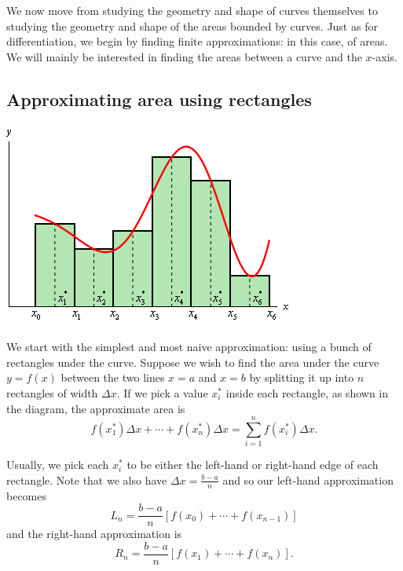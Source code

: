 


We now move from studying the geometry and shape of curves themselves to studying the geometry and shape of the areas bounded by curves. Just as
for differentiation, we begin by finding finite approximations: in this case, of areas. We will mainly be interested in finding the areas between
a curve and the $ x$-axis.

\subsection*{Approximating area using rectangles}
\begin{center}
  \includegraphics[width=0.4\linewidth]{approx-rectangles}
\end{center}
We start with the simplest and most naive approximation: using a bunch of rectangles under the curve. Suppose
we wish to find the area under the curve $ y = f(x) $ between the two lines $ x = a $ and $ x = b $ by splitting
it up into $ n $ rectangles of width $ \Delta x $. If we pick a value $ x_i^\ast $ inside each rectangle, as shown
in the diagram, the approximate area is
\begin{displaymath}
  f(x_1^\ast) \Delta x + \cdots + f(x_n^\ast) \Delta x = \sum_{i = 1}^n f(x_i^\ast) \Delta x.
\end{displaymath}

Usually, we pick each $ x_i^\ast $ to be either the left-hand or right-hand edge of each rectangle. Note that
we also have $ \Delta x = \frac{b - a}{n} $ and so our left-hand approximation becomes
\begin{displaymath}
  L_n = \frac{b - a}{n} \left[ f(x_0) + \cdots + f(x_{n - 1}) \right]
\end{displaymath}
and the right-hand approximation is
\begin{displaymath}
  R_n = \frac{b - a}{n} \left[ f(x_1) + \cdots + f(x_{n}) \right].
\end{displaymath}

